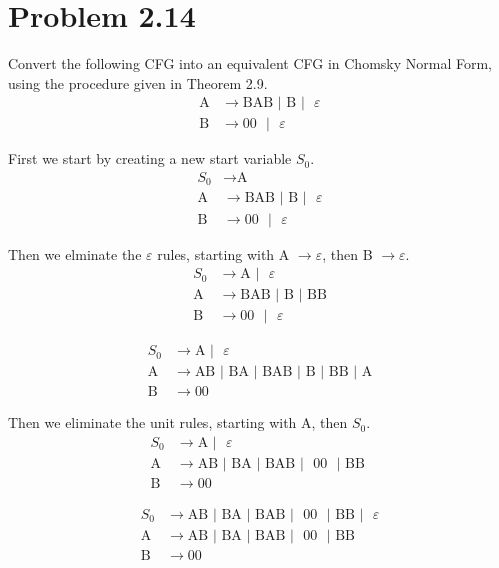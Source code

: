 \documentclass{article}
\begin{document}
\section*{Problem 2.14}
Convert the following CFG into an equivalent CFG in Chomsky Normal Form, using the procedure given in Theorem 2.9.
  \begin{align*}
   \text{A} &\rightarrow \text{BAB }|\text{ B }|\text{ }\varepsilon \\
   \text{B} &\rightarrow 00\text{ }|\text{ }\varepsilon 
  \end{align*}

First we start by creating a new start variable $S_0$.\\
  \begin{align*}
   S_0 &\rightarrow \text{A}\\
   \text{A} &\rightarrow \text{BAB }|\text{ B }|\text{ }\varepsilon \\
   \text{B} &\rightarrow 00\text{ }|\text{ }\varepsilon 
  \end{align*}

Then we elminate the $\varepsilon$ rules, starting with A $\rightarrow \varepsilon$, then B $\rightarrow \varepsilon$.
  \begin{align*}
   S_0 &\rightarrow \text{A }|\text{ }\varepsilon\\
   \text{A} &\rightarrow \text{BAB }|\text{ B }|\text{ BB} \\
   \text{B} &\rightarrow 00\text{ }|\text{ }\varepsilon 
  \end{align*}

  \begin{align*}
   S_0 &\rightarrow \text{A }|\text{ }\varepsilon\\
   \text{A} &\rightarrow \text{AB }|\text{ BA }|\text{ BAB }|\text{ B }|\text{ BB }|\text{ A} \\
   \text{B} &\rightarrow 00
  \end{align*}

Then we eliminate the unit rules, starting with A, then $S_0$.
  \begin{align*}
   S_0 &\rightarrow \text{A }|\text{ }\varepsilon\\
   \text{A} &\rightarrow \text{AB }|\text{ BA }|\text{ BAB }|\text{ }00\text{ }|\text{ BB }\\
   \text{B} &\rightarrow 00
  \end{align*}

  \begin{align*}
   S_0 &\rightarrow \text{AB }|\text{ BA }|\text{ BAB }|\text{ }00\text{ }|\text{ BB }|\text{ }\varepsilon\\
   \text{A} &\rightarrow \text{AB }|\text{ BA }|\text{ BAB }|\text{ }00\text{ }|\text{ BB }\\
   \text{B} &\rightarrow 00
  \end{align*}
\end{document}
